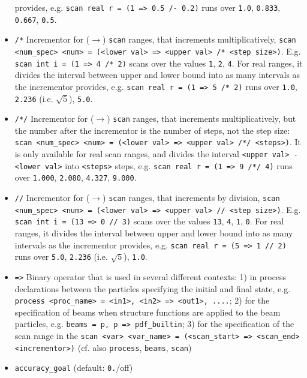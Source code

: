 \documentclass[12pt]{book}
\newcommand{\ttt}[1]{\texttt{#1}}
\begin{document}
\begin{itemize}
provides, e.g. \ttt{scan real r = (1 => 0.5 /- 0.2)} runs over 
\ttt{1.0}, \ttt{0.833}, \ttt{0.667}, \ttt{0.5}. 
\item
\ttt{/*} \newline
Incrementor for ($\to$) \ttt{scan} ranges, that increments multiplicatively,
\ttt{scan <num\_spec> <num> = (<lower val> => <upper val> /* <step
size>)}. E.g. \ttt{scan int i = (1 => 4 /* 2)} scans over the values \ttt{1}, 
\ttt{2}, \ttt{4}. For real ranges, it divides the interval
between upper and lower bound into as many intervals as the incrementor
provides, e.g. \ttt{scan real r = (1 => 5 /* 2)} runs over 
\ttt{1.0}, \ttt{2.236} (i.e. $\sqrt{5}$), \ttt{5.0}. 
\item
\ttt{/*/} \newline
Incrementor for ($\to$) \ttt{scan} ranges, that increments multiplicatively, 
but the number after the incrementor is the number of steps, not the
step size: \ttt{scan <num\_spec> <num> = (<lower val> => <upper val>
/*/ <steps>)}. It is only available for real scan ranges, and divides
the interval \ttt{<upper val> - <lower val>} into \ttt{<steps>} steps,
e.g. \ttt{scan real r = (1 => 9 /*/ 4)} runs over \ttt{1.000},
\ttt{2.080}, \ttt{4.327}, \ttt{9.000}.
\item
\ttt{//} \newline
Incrementor for ($\to$) \ttt{scan} ranges, that increments by division,
\ttt{scan <num\_spec> <num> = (<lower val> => <upper val> // <step
size>)}. E.g. \ttt{scan int i = (13 => 0 // 3)} scans over the values \ttt{13}, 
\ttt{4}, \ttt{1}, \ttt{0}. For real ranges, it divides the interval
between upper and lower bound into as many intervals as the incrementor
provides, e.g. \ttt{scan real r = (5 => 1 // 2)} runs over 
\ttt{5.0}, \ttt{2.236} (i.e. $\sqrt{5}$), \ttt{1.0}. 
\item
\ttt{=>} \newline
Binary operator that is used in several different contexts: 1) in
process declarations between the particles specifying the 
initial and final state, e.g. \ttt{process <proc\_name> = <in1>, <in2>
=> <out1>, ....}; 2) for the specification of beams when
structure functions are applied to the beam particles, e.g. \ttt{beams
= p, p => pdf\_builtin}; 3) for the specification of the scan range in
the \ttt{scan <var> <var\_name> = (<scan\_start> => <scan\_end>
  <incrementor>)} (cf. also \ttt{process}, \ttt{beams}, \ttt{scan})
\item
\ttt{accuracy\_goal} \qquad (default: \ttt{0.}/off) \newline

\end{itemize}
\end{document}
